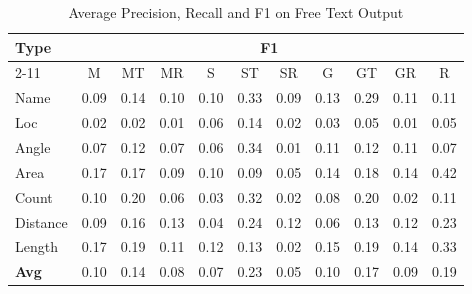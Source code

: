 \begin{table}
\caption{Average Precision, Recall and F1 on Free Text Output}
\label{tab:prf_text_average}
\begin{tabular}{l|cccccccccc}
\hline
\multirow{2}{*}{Type} & \multicolumn{10}{c}{F1} \\
\cline{2-11}
\multicolumn{1}{l|}{} & M & MT & MR & S & ST & SR & G & GT & GR & R \\
\hline
Name & 0.09 & 0.14 & 0.10 & 0.10 & 0.33 & 0.09 & 0.13 & 0.29 & 0.11 & 0.11 \\
Loc & 0.02 & 0.02 & 0.01 & 0.06 & 0.14 & 0.02 & 0.03 & 0.05 & 0.01 & 0.05 \\
Angle & 0.07 & 0.12 & 0.07 & 0.06 & 0.34 & 0.01 & 0.11 & 0.12 & 0.11 & 0.07 \\
Area & 0.17 & 0.17 & 0.09 & 0.10 & 0.09 & 0.05 & 0.14 & 0.18 & 0.14 & 0.42 \\
Count & 0.10 & 0.20 & 0.06 & 0.03 & 0.32 & 0.02 & 0.08 & 0.20 & 0.02 & 0.11 \\
Distance & 0.09 & 0.16 & 0.13 & 0.04 & 0.24 & 0.12 & 0.06 & 0.13 & 0.12 & 0.23 \\
Length & 0.17 & 0.19 & 0.11 & 0.12 & 0.13 & 0.02 & 0.15 & 0.19 & 0.14 & 0.33 \\
\hline
\textbf{Avg} & 0.10 & 0.14 & 0.08 & 0.07 & 0.23 & 0.05 & 0.10 & 0.17 & 0.09 & 0.19 \\
\hline
\end{tabular}
\end{table}